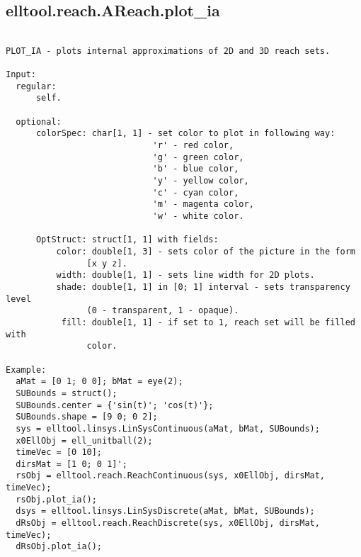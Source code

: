 \subsection{\texorpdfstring{elltool.reach.AReach.plot\_ia}{plot\_ia}}\label{method:elltool.reach.AReach.plotia}
\begin{verbatim}

PLOT_IA - plots internal approximations of 2D and 3D reach sets.

Input:
  regular:
      self.

  optional:
      colorSpec: char[1, 1] - set color to plot in following way:
                             'r' - red color,
                             'g' - green color,
                             'b' - blue color,
                             'y' - yellow color,
                             'c' - cyan color,
                             'm' - magenta color,
                             'w' - white color.

      OptStruct: struct[1, 1] with fields:
          color: double[1, 3] - sets color of the picture in the form
                [x y z].
          width: double[1, 1] - sets line width for 2D plots.
          shade: double[1, 1] in [0; 1] interval - sets transparency level
                (0 - transparent, 1 - opaque).
           fill: double[1, 1] - if set to 1, reach set will be filled with
                color.

Example:
  aMat = [0 1; 0 0]; bMat = eye(2);
  SUBounds = struct();
  SUBounds.center = {'sin(t)'; 'cos(t)'};
  SUBounds.shape = [9 0; 0 2];
  sys = elltool.linsys.LinSysContinuous(aMat, bMat, SUBounds);
  x0EllObj = ell_unitball(2);
  timeVec = [0 10];
  dirsMat = [1 0; 0 1]';
  rsObj = elltool.reach.ReachContinuous(sys, x0EllObj, dirsMat, timeVec);
  rsObj.plot_ia();
  dsys = elltool.linsys.LinSysDiscrete(aMat, bMat, SUBounds);
  dRsObj = elltool.reach.ReachDiscrete(sys, x0EllObj, dirsMat, timeVec);
  dRsObj.plot_ia();
\end{verbatim}
